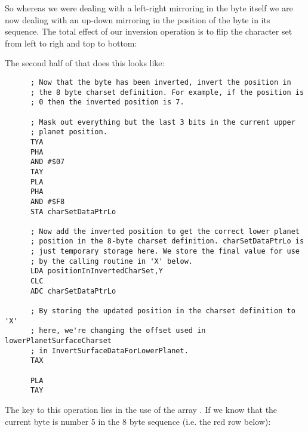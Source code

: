 So whereas we were dealing with a left-right mirroring in the byte itself we are now dealing with an up-down
mirroring in the position of the byte in its sequence. The total effect of our inversion operation is
to flip the character set from left to righ and top to bottom:

\begin{figure}[H]
{
  \setlength{\tabcolsep}{3.0pt}
  \setlength\cmidrulewidth{\heavyrulewidth} %
    \begin{adjustbox}{width=10cm,center}
  \begin{subfigure}{0.3\textwidth}
  
  \end{subfigure}
  \begin{subfigure}{0.3\textwidth}
  
  \end{subfigure}
  \end{adjustbox}
}\caption[]{}
\end{figure}

The second half of  that does this looks like:

\begin{lstlisting}
      ; Now that the byte has been inverted, invert the position in
      ; the 8 byte charset definition. For example, if the position is
      ; 0 then the inverted position is 7.

      ; Mask out everything but the last 3 bits in the current upper
      ; planet position. 
      TYA
      PHA
      AND #$07
      TAY
      PLA
      PHA
      AND #$F8
      STA charSetDataPtrLo

      ; Now add the inverted position to get the correct lower planet
      ; position in the 8-byte charset definition. charSetDataPtrLo is
      ; just temporary storage here. We store the final value for use
      ; by the calling routine in 'X' below.
      LDA positionInInvertedCharSet,Y
      CLC
      ADC charSetDataPtrLo

      ; By storing the updated position in the charset definition to 'X'
      ; here, we're changing the offset used in lowerPlanetSurfaceCharset
      ; in InvertSurfaceDataForLowerPlanet.
      TAX

      PLA
      TAY
\end{lstlisting}

The key to this operation lies in the use of the array .
If we know that the current byte is number 5 in the 8 byte sequence (i.e. the red row
below):

